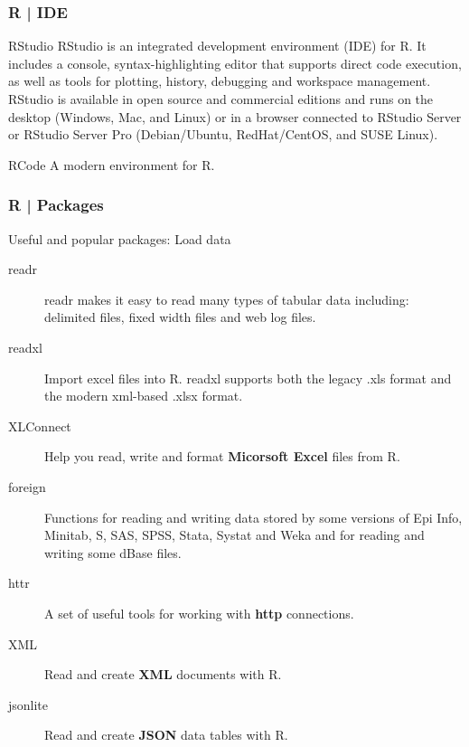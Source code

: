 \begin{frame}
  \frametitle{R | IDE}
  \begin{block}{\alert{RStudio}}
 RStudio is an integrated development environment (IDE) for R. It includes a console, syntax-highlighting editor that supports direct code execution, as well as tools for plotting, history, debugging and workspace management.\\
 \vspace{0.3em}
 RStudio is available in open source and commercial editions and runs on the desktop (Windows, Mac, and Linux) or in a browser connected to RStudio Server or RStudio Server Pro (Debian/Ubuntu, RedHat/CentOS, and SUSE Linux).
  \end{block}
  \pause
  \begin{block}{RCode}
    A modern environment for R.
  \end{block}
\end{frame}

\begin{frame}
  \frametitle{R | Packages}
  \begin{block}{Useful and popular packages: Load data}
    \begin{description}
      \item[\alert{readr}] readr makes it easy to read many types of \alert{tabular data} including: delimited files, fixed width files and web log files.
      \item[\alert{readxl}] Import \alert{excel files} into R. readxl supports both the legacy .xls format and the modern xml-based .xlsx format.
      \item[XLConnect] Help you read, write and format \textbf{Micorsoft Excel} files from R.
      \item[foreign] Functions for reading and writing data stored by some versions of Epi Info, Minitab, S, SAS, SPSS, Stata, Systat and Weka and for reading and writing some dBase files.
      \item[httr] A set of useful tools for working with \textbf{http} connections.
      \item[XML] Read and create \textbf{XML} documents with R.
      \item[jsonlite] Read and create \textbf{JSON} data tables with R.
    \end{description}
  \end{block}
\end{frame}

